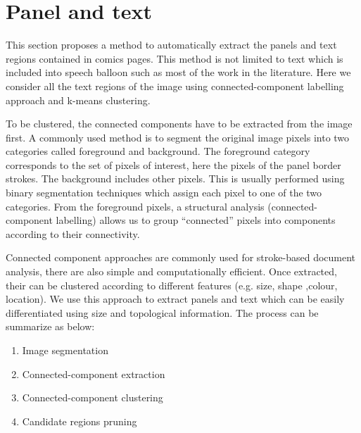 
\section{Panel and text} %
\label{sec:se:panel_and_text}


This section proposes a method to automatically extract the panels and text regions contained in comics pages.
This method is not limited to text which is included into speech balloon such as most of the work in the literature.
Here we consider all the text regions of the image using connected-component labelling approach and k-means clustering.


To be clustered, the connected components have to be extracted from the image first.
A commonly used method is to segment the original image pixels into two categories called foreground and background.
The foreground category corresponds to the set of pixels of interest, here the pixels of the panel border strokes.
The background includes other pixels.
This is usually performed using binary segmentation techniques which assign each pixel to one of the two categories.
From the foreground pixels, a structural analysis (connected-component labelling) allows us to group ``connected'' pixels into components according to their connectivity.

Connected component approaches are commonly used for stroke-based document analysis, there are also simple and computationally efficient.
Once extracted, their can be clustered according to different features (e.g. size, shape ,colour, location).
We use this approach to extract panels and text which can be easily differentiated using size and topological information.
The process can be summarize as below:
  \begin{enumerate}
	\item Image segmentation
	\item Connected-component extraction
	\item Connected-component clustering
	\item Candidate regions pruning
  \end{enumerate}


